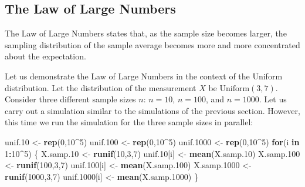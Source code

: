 \documentclass[
]{krantz}
\makeatletter
\newenvironment{Shaded}{\begin{snugshade}}{\end{snugshade}}
\newcommand{\ControlFlowTok}[1]{\textcolor[rgb]{0.13,0.29,0.53}{\textbf{#1}}}
\newcommand{\DecValTok}[1]{\textcolor[rgb]{0.00,0.00,0.81}{#1}}
\newcommand{\FloatTok}[1]{\textcolor[rgb]{0.00,0.00,0.81}{#1}}
\newcommand{\KeywordTok}[1]{\textcolor[rgb]{0.13,0.29,0.53}{\textbf{#1}}}
\newcommand{\NormalTok}[1]{#1}
\newcommand{\OperatorTok}[1]{\textcolor[rgb]{0.81,0.36,0.00}{\textbf{#1}}}
\newcommand{\StringTok}[1]{\textcolor[rgb]{0.31,0.60,0.02}{#1}}
\newenvironment{kframe}{%
\medskip{}
\setlength{\fboxsep}{.8em}
 \def\at@end@of@kframe{}%
 \ifinner\ifhmode%
  \def\at@end@of@kframe{\end{minipage}}%
  \begin{minipage}{\columnwidth}%
 \fi\fi%
 \def\FrameCommand##1{\hskip\@totalleftmargin \hskip-\fboxsep
 \colorbox{shadecolor}{##1}\hskip-\fboxsep
     \hskip-\linewidth \hskip-\@totalleftmargin \hskip\columnwidth}%
 \MakeFramed {\advance\hsize-\width
   \@totalleftmargin\z@ \linewidth\hsize
   \@setminipage}}%
 {\par\unskip\endMakeFramed%
 \at@end@of@kframe}
\renewenvironment{Shaded}{\begin{kframe}}{\end{kframe}}
\theoremstyle{definition}
\theoremstyle{definition}
\theoremstyle{definition}
\theoremstyle{remark}
\makeatother
\begin{document}
\hypertarget{the-law-of-large-numbers}{%
\subsection{The Law of Large Numbers}\label{the-law-of-large-numbers}}

The Law of Large Numbers states that, as the sample size becomes larger,
the sampling distribution of the sample average becomes more and more
concentrated about the expectation.

Let us demonstrate the Law of Large Numbers in the context of the
Uniform distribution. Let the distribution of the measurement \(X\) be
\(\mathrm{Uniform}(3,7)\). Consider three different sample sizes \(n\):
\(n=10\), \(n=100\), and \(n=1000\). Let us carry out a simulation similar to
the simulations of the previous section. However, this time we run the
simulation for the three sample sizes in parallel:

\begin{Shaded}
\begin{Highlighting}[]
\NormalTok{unif}\FloatTok{.10}\NormalTok{ <-}\StringTok{ }\KeywordTok{rep}\NormalTok{(}\DecValTok{0}\NormalTok{,}\DecValTok{10}\OperatorTok{^}\DecValTok{5}\NormalTok{)}
\NormalTok{unif}\FloatTok{.100}\NormalTok{ <-}\StringTok{ }\KeywordTok{rep}\NormalTok{(}\DecValTok{0}\NormalTok{,}\DecValTok{10}\OperatorTok{^}\DecValTok{5}\NormalTok{)}
\NormalTok{unif}\FloatTok{.1000}\NormalTok{ <-}\StringTok{ }\KeywordTok{rep}\NormalTok{(}\DecValTok{0}\NormalTok{,}\DecValTok{10}\OperatorTok{^}\DecValTok{5}\NormalTok{)}
\ControlFlowTok{for}\NormalTok{(i }\ControlFlowTok{in} \DecValTok{1}\OperatorTok{:}\DecValTok{10}\OperatorTok{^}\DecValTok{5}\NormalTok{) \{}
\NormalTok{  X.samp}\FloatTok{.10}\NormalTok{ <-}\StringTok{ }\KeywordTok{runif}\NormalTok{(}\DecValTok{10}\NormalTok{,}\DecValTok{3}\NormalTok{,}\DecValTok{7}\NormalTok{)}
\NormalTok{  unif}\FloatTok{.10}\NormalTok{[i] <-}\StringTok{ }\KeywordTok{mean}\NormalTok{(X.samp}\FloatTok{.10}\NormalTok{)}
\NormalTok{  X.samp}\FloatTok{.100}\NormalTok{ <-}\StringTok{ }\KeywordTok{runif}\NormalTok{(}\DecValTok{100}\NormalTok{,}\DecValTok{3}\NormalTok{,}\DecValTok{7}\NormalTok{)}
\NormalTok{  unif}\FloatTok{.100}\NormalTok{[i] <-}\StringTok{ }\KeywordTok{mean}\NormalTok{(X.samp}\FloatTok{.100}\NormalTok{)}
\NormalTok{  X.samp}\FloatTok{.1000}\NormalTok{ <-}\StringTok{ }\KeywordTok{runif}\NormalTok{(}\DecValTok{1000}\NormalTok{,}\DecValTok{3}\NormalTok{,}\DecValTok{7}\NormalTok{)}
\NormalTok{  unif}\FloatTok{.1000}\NormalTok{[i] <-}\StringTok{ }\KeywordTok{mean}\NormalTok{(X.samp}\FloatTok{.1000}\NormalTok{)}
\NormalTok{\}}
\end{Highlighting}
\end{Shaded}
\end{document}

